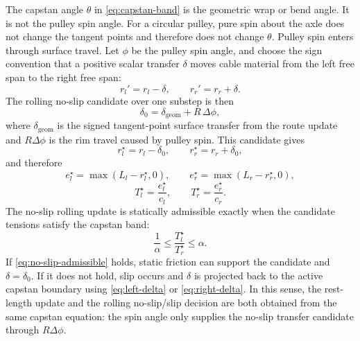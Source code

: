 \documentclass[11pt]{article}
\newcommand{\dd}{\Delta}
\begin{document}
The capstan angle $\theta$ in \eqref{eq:capstan-band} is the geometric wrap or
bend angle.  It is not the pulley spin angle.  For a circular pulley, pure spin
about the axle does not change the tangent points and therefore does not change
$\theta$.  Pulley spin enters through surface travel.  Let $\phi$ be the pulley
spin angle, and choose the sign convention that a positive scalar transfer
$\delta$ moves cable material from the left free span to the right free span:
\[
  r_l' = r_l-\delta,\qquad r_r'=r_r+\delta.
\]
The rolling no-slip candidate over one substep is then
\begin{equation}
  \delta_0 = \delta_\mathrm{geom} + R\,\dd\phi,
  \label{eq:no-slip-transfer}
\end{equation}
where $\delta_\mathrm{geom}$ is the signed tangent-point surface transfer from
the route update and $R\dd\phi$ is the rim travel caused by pulley spin.  This
candidate gives
\begin{equation}
  r_l^\star = r_l-\delta_0,\qquad
  r_r^\star = r_r+\delta_0,
  \label{eq:no-slip-rest-candidate}
\end{equation}
and therefore
\begin{equation}
  e_l^\star=\max(L_l-r_l^\star,0),\qquad
  e_r^\star=\max(L_r-r_r^\star,0),
\end{equation}
\begin{equation}
  T_l^\star=\frac{e_l^\star}{c_l},\qquad
  T_r^\star=\frac{e_r^\star}{c_r}.
\end{equation}
The no-slip rolling update is statically admissible exactly when the candidate
tensions satisfy the capstan band:
\begin{equation}
  \frac{1}{\alpha}
  \le
  \frac{T_l^\star}{T_r^\star}
  \le
  \alpha.
  \label{eq:no-slip-admissible}
\end{equation}
If \eqref{eq:no-slip-admissible} holds, static friction can support the
candidate and $\delta=\delta_0$.  If it does not hold, slip occurs and
$\delta$ is projected back to the active capstan boundary using
\eqref{eq:left-delta} or \eqref{eq:right-delta}.  In this sense, the
rest-length update and the rolling no-slip/slip decision are both obtained from
the same capstan equation: the spin angle only supplies the no-slip transfer
candidate through $R\dd\phi$.
\end{document}

